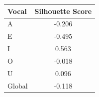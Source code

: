 \begin{tabular}{lc}
\toprule
\rowcolor{col01}
Vocal & Silhouette Score \\
\midrule
A & -0.206 \\
E & -0.495 \\
I & 0.563 \\
O & -0.018 \\
U & 0.096 \\
Global & -0.118 \\
\bottomrule
\end{tabular}
